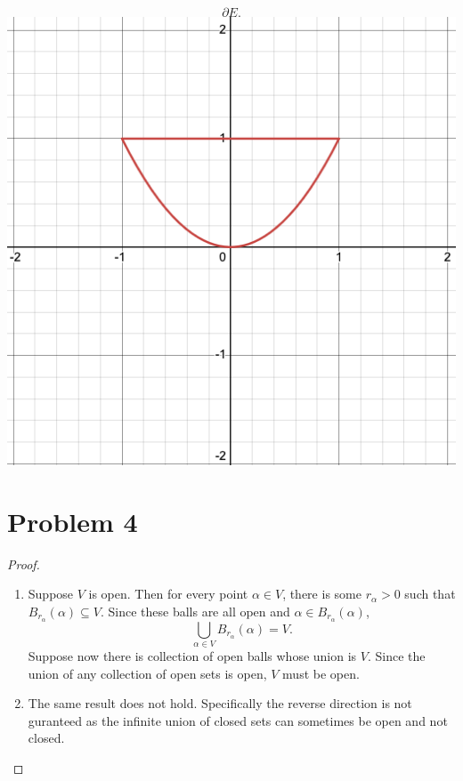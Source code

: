\documentclass{eeleyes}
\begin{document}
\begin{multicols}{3}
\columnbreak

\begin{center}
    \[
        \partial E
    .\]
    \includegraphics[width=0.8\linewidth]{figures/iii_img-3.png}
\end{center}
\end{multicols}

\section*{Problem 4}
\begin{proof}
    \begin{enumerate}[label=\roman*)]
        \item Suppose $V$ is open. Then for every point $\alpha \in V$, there is some $r_{\alpha} > 0$ such that $B_{r_{\alpha}}(\alpha) \subseteq V$. Since these balls are all open and $\alpha \in B_{r_{\alpha}}(\alpha)$,
        \[
            \bigcup_{\alpha \in V} B_{r_{\alpha}}(\alpha) = V
        .\]
        Suppose now there is collection of open balls whose union is $V$. Since the union of any collection of open sets is open, $V$ must be open.
        \item The same result does not hold. Specifically the reverse direction is not guranteed as the infinite union of closed sets can sometimes be open and not closed.
    \end{enumerate}
\end{proof}
\end{document}

